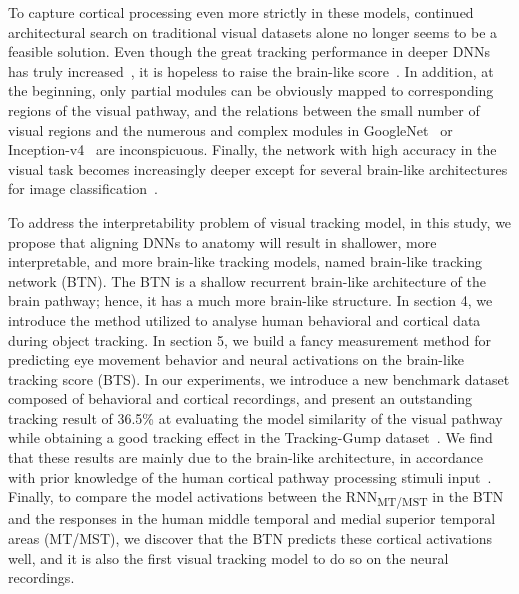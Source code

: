 \documentclass[journal]{IEEEtran}
\begin{document}
To capture cortical processing even more strictly in these models, continued architectural search on traditional visual datasets alone no longer seems to be a feasible solution. 
Even though the great tracking performance in deeper DNNs has truly increased~\cite{ILSVRC15,luo2021trajectory}, it is hopeless to raise the brain-like score~\cite{rajalingham2018large,su2020incremental}. 
In addition, at the beginning, only partial modules can be obviously mapped to corresponding regions of the visual pathway, 
and the relations between the small number of visual regions and the numerous and complex modules in GoogleNet~\cite{szegedy2015going} or Inception-v4~\cite{szegedy2017inception} are inconspicuous. 
Finally, the network with high accuracy in the visual task becomes increasingly deeper except for several brain-like architectures for image classification~\cite{TangSchrimpfLotter2018Recurrent, kar2019evidence}. 


To address the interpretability problem of visual tracking model, in this study, we propose that aligning DNNs to anatomy will result in shallower, more interpretable, and more brain-like tracking models, named brain-like tracking network (BTN).
The BTN is a shallow recurrent brain-like architecture of the brain pathway; 
hence, it has a much more brain-like structure. 
In section 4, we introduce the method utilized to analyse human behavioral and cortical data during object tracking. 
In section 5, we build a fancy measurement method for predicting eye movement behavior and neural activations on the brain-like tracking score (BTS). 
In our experiments, we introduce a new benchmark dataset composed of behavioral and cortical recordings, 
and present an outstanding tracking result of 36.5\% at evaluating the model similarity of the visual pathway while obtaining a good tracking effect in the Tracking-Gump dataset~\cite{gaze_forrest}. 
We find that these results are mainly due to the brain-like architecture, in accordance with prior knowledge of the human cortical pathway processing stimuli input~\cite{TangSchrimpfLotter2018Recurrent, yin2020deep, kar2019evidence}. 
Finally, to compare the model activations between the RNN\textsubscript{MT/MST} in the BTN and the responses in the human middle temporal and medial superior temporal areas (MT/MST), we discover that the BTN predicts these cortical activations well, 
and it is also the first visual tracking model to do so on the neural recordings. 

\end{document}
